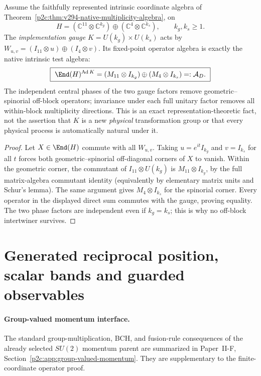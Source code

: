 \documentclass[12pt,a4paper]{article}
\begin{document}
\begin{theorem}
\label{p2c:thm:v301-intrinsic-gauge-fixedpoints}
Assume the faithfully represented intrinsic coordinate algebra of
Theorem~\ref{p2c:thm:v294-native-multiplicity-algebra}, on
\[
 H=(\mathbb C^{11}\otimes\mathbb C^{k_g})\oplus
   (\mathbb C^4\otimes\mathbb C^{k_s}),\qquad k_g,k_s\ge1.
\]
The \emph{implementation gauge} $K=U(k_g)\times U(k_s)$ acts by
$W_{u,v}=(I_{11}\otimes u)\oplus(I_4\otimes v)$. Its fixed-point
operator algebra is exactly the native intrinsic test algebra:
\[
 \boxed{\ \End(H)^{\operatorname{Ad}K}
   =(M_{11}\otimes I_{k_g})\oplus(M_4\otimes I_{k_s})
   =:\mathcal A_D.\ }
\]
The independent central phases of the two gauge factors remove
geometric--spinorial off-block operators; invariance under each full
unitary factor removes all within-block multiplicity directions.
This is an exact representation-theoretic fact, not the assertion
that $K$ is a new \emph{physical} transformation group or that every
physical process is automatically natural under it.
\end{theorem}
\begin{proof}
Let $X\in\End(H)$ commute with all $W_{u,v}$. Taking
$u=e^{it}I_{k_g}$ and $v=I_{k_s}$ for all $t$ forces both
geometric--spinorial off-diagonal corners of $X$ to vanish. Within
the geometric corner, the commutant of $I_{11}\otimes U(k_g)$ is
$M_{11}\otimes I_{k_g}$, by the full matrix-algebra commutant
identity (equivalently by elementary matrix units and Schur's
lemma). The same argument gives $M_4\otimes I_{k_s}$ for the
spinorial corner. Every operator in the displayed direct sum
commutes with the gauge, proving equality. The two phase factors
are independent even if $k_g=k_s$; this is why no off-block
intertwiner survives.
\end{proof}




\section{Generated reciprocal position, scalar bands and guarded observables}
\paragraph{Group-valued momentum interface.}
The standard group-multiplication, BCH, and fusion-rule consequences of the
already selected \(SU(2)\) momentum parent are summarized in
Paper~II-F, Section~\ref{p2c:app:group-valued-momentum}.  They are supplementary to the
finite-coordinate operator proof.
\end{document}
